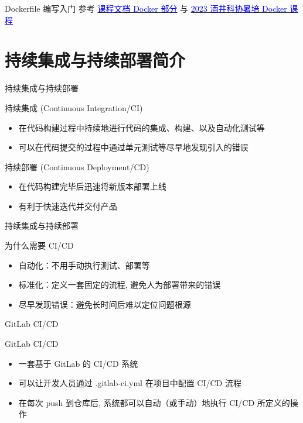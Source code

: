 \documentclass{beamer}
\begin{document}
\begin{frame}{Dockerfile 编写入门}
参考 \href{https://thuse-course.github.io/course-index/deploy/docker/}{\textcolor{blue}{课程文档 Docker 部分}} 与 \href{https://summer23.net9.org/sast2023-docker/}{\textcolor{blue}{2023 酒井科协暑培 Docker 课程}}
\end{frame}

\section{持续集成与持续部署简介}

\begin{frame}{持续集成与持续部署}
    \begin{block}{持续集成 (Continuous Integration/CI)}
        \begin{itemize}
            \item 在代码构建过程中持续地进行代码的集成、构建、以及自动化测试等
            \item 可以在代码提交的过程中通过单元测试等尽早地发现引入的错误
        \end{itemize}
    \end{block}
    
    \begin{block}{持续部署 (Continuous Deployment/CD)}
        \begin{itemize}
            \item 在代码构建完毕后迅速将新版本部署上线
            \item 有利于快速迭代并交付产品
        \end{itemize}
    \end{block}
\end{frame}

\begin{frame}{持续集成与持续部署}
    \begin{block}{为什么需要 CI/CD}
        \begin{itemize}
            \item 自动化：不用手动执行测试、部署等
            \item 标准化：定义一套固定的流程, 避免人为部署带来的错误
            \item 尽早发现错误：避免长时间后难以定位问题根源
        \end{itemize}
    \end{block}
\end{frame}

\begin{frame}{GitLab CI/CD}
    \begin{block}{GitLab CI/CD}
        \begin{itemize}
            \item 一套基于 GitLab 的 CI/CD 系统
            \item 可以让开发人员通过 .gitlab-ci.yml 在项目中配置 CI/CD 流程
            \item 在每次 push 到仓库后, 系统都可以自动（或手动）地执行 CI/CD 所定义的操作
        \end{itemize}
    \end{block}
\end{frame}
\end{document}
